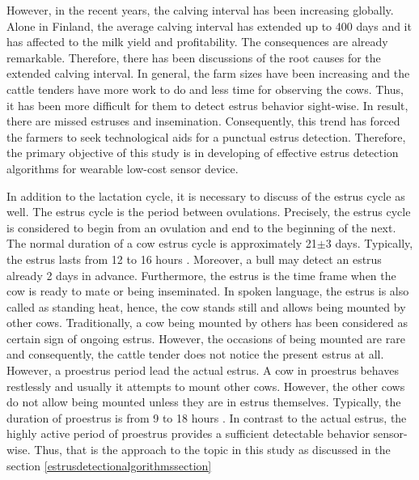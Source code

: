 \documentclass[english,12pt,a4paper,pdftex,elec,utf8]{aaltothesis}
\begin{document}
However, in the recent years, the calving interval has been increasing globally. Alone in Finland, the average calving interval has extended up to 400 days and it has affected to the milk yield and profitability. The consequences are already remarkable. Therefore, there has been discussions of the root causes for the extended calving interval. In general, the farm sizes have been increasing and the cattle tenders have more work to do and less time for observing the cows. Thus, it has been more difficult for them to detect estrus behavior sight-wise. In result, there are missed estruses and insemination. Consequently, this trend has forced the farmers to seek technological aids for a punctual estrus detection. Therefore, the primary objective of this study is in developing of effective estrus detection algorithms for wearable low-cost sensor device.

In addition to the lactation cycle, it is necessary to discuss of the estrus cycle as well. The estrus cycle is the period between ovulations. Precisely, the estrus cycle is considered to begin from an ovulation and end to the beginning of the next. The normal duration of a cow estrus cycle is approximately 21$\pm$3 days. Typically, the estrus lasts from 12 to 16 hours \cite{julkaisuja52}. Moreover, a bull may detect an estrus already 2 days in advance. Furthermore, the estrus is the time frame when the cow is ready to mate or being inseminated. In spoken language, the estrus is also called as standing heat, hence, the cow stands still and allows being mounted by other cows. Traditionally, a cow being mounted by others has been considered as certain sign of ongoing estrus. However, the occasions of being mounted are rare and consequently, the cattle tender does not notice the present estrus at all. However, a proestrus period lead the actual estrus. A cow in proestrus behaves restlessly and usually it attempts to mount other cows. However, the other cows do not allow being mounted unless they are in estrus themselves. Typically, the duration of proestrus is from 9 to 18 hours \cite{lehmahavaintoja}. In contrast to the actual estrus, the highly active period of proestrus provides a sufficient detectable behavior sensor-wise. Thus, that is the approach to the topic in this study as discussed in the section \ref{estrusdetectionalgorithmssection}


\end{document}
